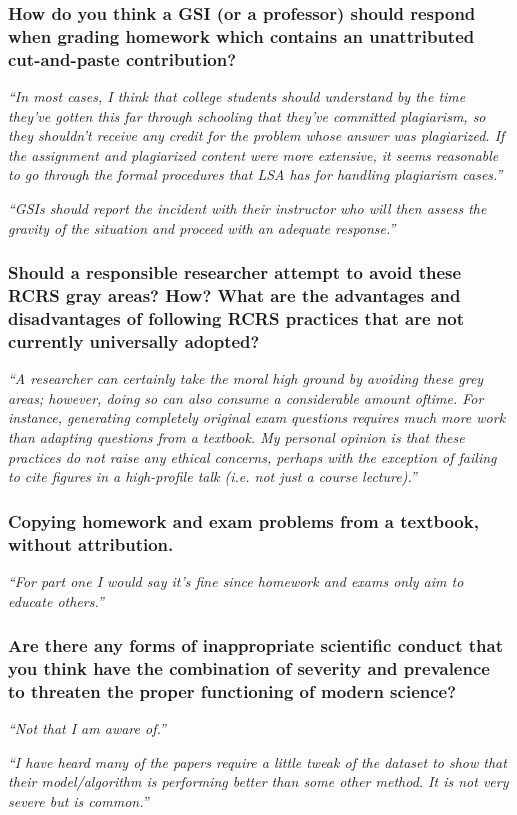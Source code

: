 \documentclass[12pt]{beamer}
\newcommand\ans[1]{{\it ``#1''}}
\newcommand\gap{\vspace{5mm}}
\begin{document}
\begin{frame} %
\frametitle{How do you think a GSI (or a professor) should respond when grading homework which contains an unattributed cut-and-paste contribution?}

\ans{In  most  cases,  I  think  that  college  students  should  understand  by  the  time  they've gotten this far through schooling that they've committed plagiarism, so they shouldn't receive any credit for the problem whose answer was plagiarized.  If the assignment and plagiarized content were more extensive, it seems reasonable to go through the formal procedures that LSA has for handling plagiarism cases.}

\gap

\ans{GSIs should report the incident with their instructor who will then assess the gravity of the situation and proceed with an adequate response.}



\end{frame}

\begin{frame}  %
  \frametitle{Should a responsible researcher attempt to avoid these RCRS gray areas? How? What are the advantages and disadvantages of following RCRS practices that are not currently universally adopted?}


\ans{A researcher can certainly take the moral high ground by avoiding these grey areas; however, doing so can also consume a considerable amount oftime.  For instance, generating completely original exam questions requires much more work than adapting questions from a textbook.  My personal opinion is that these practices do not raise any ethical concerns, perhaps with the exception of failing to cite figures in a high-profile talk (i.e.  not just a course lecture).}

\end{frame}

\begin{frame}

\frametitle{Copying homework and exam problems from a textbook, without attribution.}

\ans{For part one I would say it's fine since homework and exams only aim to educate others.}

\end{frame}


\begin{frame}   %

  \frametitle{ 
 Are there any forms of inappropriate scientific conduct that you think have the combination of severity and prevalence to threaten the proper functioning of modern science? 
}


\ans{Not that I am aware of.}

\gap

\ans{I have heard many of the papers require a little tweak of the dataset to show that their model/algorithm is performing better than some other method.  It is not very severe but is common.}

\end{frame}
\end{document}
